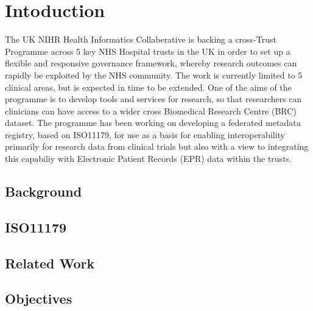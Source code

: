 \section{Intoduction}

The UK NIHR Health Informatics Collaberative is backing a cross-Trust Programme across 5 key NHS Hospital trusts in the UK in order to set up a flexible and responsive governance framework, whereby research outcomes can rapidly be exploited by the NHS community. The work is currently limited to 5 clinical areas, but is expected in time to be extended. One of the aims of the programme is to develop tools and services for research, so that researchers can clinicians can have access to a wider cross Biomedical Research Centre (BRC) dataset. The programme has been working on developing a federated metadata registry, based on ISO11179\cite{ISO11179}, for use as a basis for enabling interoperability primarily for research data from clinical trials but also with a view to integrating this capabiliy with Electronic Patient Records (EPR) data within the trusts.

\subsection{Background}


\subsection{ISO11179}


\subsection{Related Work}


\subsection{Objectives}